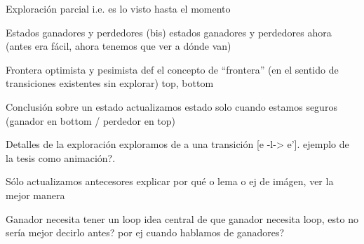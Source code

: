 \begin{frame}{Exploración parcial}
    i.e. es lo visto hasta el momento
\end{frame}
\begin{frame}{Estados ganadores y perdedores (bis)}
    estados ganadores y perdedores ahora (antes era fácil, ahora tenemos que ver a dónde van)
\end{frame}
\begin{frame}{Frontera optimista y pesimista}
    def el concepto de ``frontera'' (en el sentido de transiciones existentes sin explorar) top, bottom
\end{frame}
\begin{frame}{Conclusión sobre un estado}
    actualizamos estado solo cuando estamos seguros (ganador en bottom / perdedor en top)
\end{frame}
\begin{frame}{Detalles de la exploración}
    exploramos de a una transición [e -l-> e']. 
    ejemplo de la tesis como animación?. 
\end{frame}
\begin{frame}{Sólo actualizamos antecesores}
    explicar por qué o lema o ej de imágen, ver la mejor manera
\end{frame}
\begin{frame}{Ganador necesita tener un loop}
    idea central de que ganador necesita loop, esto no sería mejor decirlo antes? por ej cuando hablamos de ganadores?
\end{frame}
